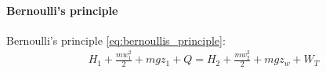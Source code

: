 

\paragraph{Bernoulli's principle}
Bernoulli's principle \ref{eq:bernoullis_principle}:
\begin{align}
    H_1 + \frac{mw_1^2}{2} + mgz_1 + Q = H_2 + \frac{mw_2^2}{2} + mgz_w +
    W_T
    \label{eq:bernoullis_principle}
\end{align}

